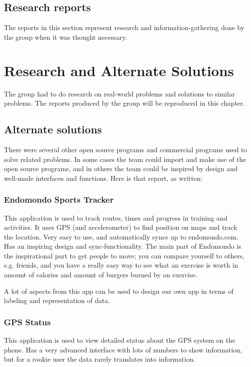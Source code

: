 \section{Research reports}
The reports in this section represent research and information-gathering done by the group when it was thought necessary.
\chapter{Research and Alternate Solutions}
The group had to do research on real-world problems and solutions to similar problems. The reports produced by the group will be reproduced in this chapter.






\section{Alternate solutions}
There were several other open source programs and commercial programs used to solve related problems. In some cases the team could import and make use of the open source programs, and in others the team could be inspired by design and well-made interfaces and functions. Here is that report, as written:

\subsection{Endomondo Sports Tracker}
This application is used to track routes, times and progress in training and activities. It uses GPS (and accelerometer) to find position on maps and track the location. Very easy to use, and automatically syncs up to endomondo.com. Has an inspiring design and sync-functionality.
The main part of Endomondo is the inspirational part to get people to move; you can compare yourself to others, e.g. friends, and you have a really easy way to see what an exercise is worth in amount of calories and amount of burgers burned by an exercise.

A lot of aspects from this app can be used to design our own app in terms of labeling and representation of data.

\subsection{GPS Status}
This application is used to view detailed status about the GPS system on the phone. Has a very advanced interface with lots of numbers to show information, but for a rookie user the data rarely translates into information.

